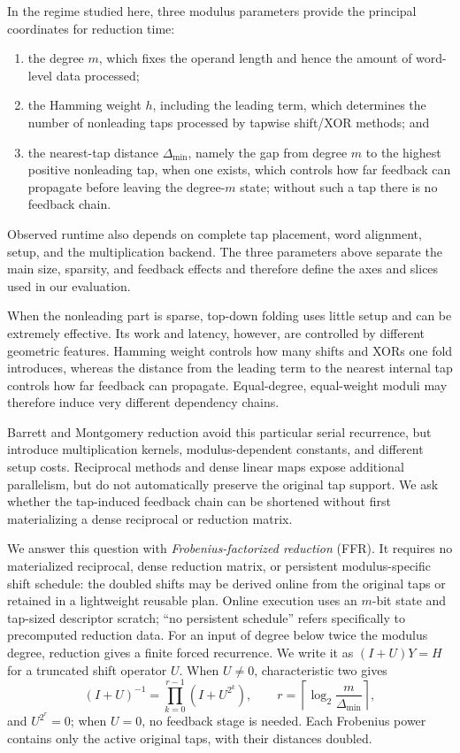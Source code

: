 \documentclass{mcom-l}
\numberwithin{equation}{section}
\theoremstyle{definition}
\theoremstyle{remark}
\newcommand{\Dmin}{\Delta_{\min}}
\begin{document}
In the regime studied here, three modulus parameters provide the principal
coordinates for reduction time:
\begin{enumerate}
\item the degree $m$, which fixes the operand length and hence the amount of
      word-level data processed;
\item the Hamming weight $h$, including the leading term, which determines
      the number of nonleading taps processed by tapwise shift/XOR methods; and
\item the nearest-tap distance $\Dmin$, namely the gap from degree $m$ to the
      highest positive nonleading tap, when one exists, which controls how far
      feedback can propagate before leaving the degree-$m$ state; without
      such a tap there is no feedback chain.
\end{enumerate}
Observed runtime also depends on complete tap placement, word alignment,
setup, and the multiplication backend.  The three parameters above separate
the main size, sparsity, and feedback effects and therefore define the axes
and slices used in our evaluation.

When the nonleading part is sparse, top-down folding uses little setup and can
be extremely effective.  Its work and latency, however, are controlled by
different geometric features.  Hamming weight controls how many shifts and
XORs one fold introduces, whereas the distance from the leading term to the
nearest internal tap controls how far feedback can propagate.  Equal-degree,
equal-weight moduli may therefore induce very different dependency chains.

Barrett and Montgomery reduction avoid this particular serial recurrence, but
introduce multiplication kernels, modulus-dependent constants, and different
setup costs.  Reciprocal methods and dense linear maps expose additional
parallelism, but do not automatically preserve the original tap support.  We
ask whether the tap-induced feedback chain can be shortened without first
materializing a dense reciprocal or reduction matrix.

We answer this question with \emph{Frobenius-factorized reduction} (FFR).
It requires no materialized reciprocal, dense reduction matrix, or persistent
modulus-specific shift schedule: the doubled shifts may be derived online
from the original taps or retained in a lightweight reusable plan.  Online
execution uses an $m$-bit state and tap-sized descriptor scratch; ``no
persistent schedule'' refers specifically to precomputed reduction data.  For
an input of degree below twice the modulus degree, reduction gives a
finite forced recurrence.  We write it as $(I+U)Y=H$ for a truncated shift
operator $U$.  When $U\ne0$, characteristic two gives
\begin{equation}
  (I+U)^{-1}=\prod_{k=0}^{r-1}(I+U^{2^k}),
  \qquad
  r=\left\lceil\log_2\frac{m}{\Dmin}\right\rceil,
  \label{eq:intro-factorization}
\end{equation}
and $U^{2^r}=0$; when $U=0$, no feedback stage is needed.  Each Frobenius
power contains only the active original taps, with their distances doubled.
\end{document}
